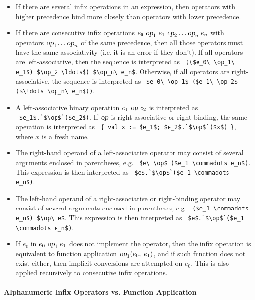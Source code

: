 \begin{itemize}
  \item If there are several infix operations in an expression, then operators with higher precedence bind more closely than operators with lower precedence. 

  \item If there are consecutive infix operations $e_0\ \mbox{\sl op}_1\ e_1\ \mbox{\sl op}_2 \ldots \mbox{\sl op}_n\ e_n$ with operators $\mbox{\sl op}_1 \ldots \mbox{\sl op}_n$ of the same precedence, then all those operators must have the same associativity (i.e. it is an error if they don't). If all operators are left-associative, then the sequence is interpreted as ~\lstinline!(($e_0\ \op_1\ e_1$) $\op_2 \ldots$) $\op_n\ e_n$!. Otherwise, if all operators are right-associative, the sequence is interpreted as ~\lstinline!$e_0\ \op_1$ ($e_1\ \op_2$ ($\ldots \op_n\ e_n$))!.

  \item A left-associative binary operation $e_1\ \mbox{\sl op}\ e_2$ is interpreted as ~\lstinline!$e_1$.`$\op$`($e_2$)!. If $\mbox{\sl op}$ is right-associative or right-binding, the same operation is interpreted as ~\lstinline!{ val x := $e_1$; $e_2$.`$\op$`($x$) }!, where $x$ is a fresh name. 

  \item The right-hand operand of a left-associative operator may consist of several arguments enclosed in parentheses, e.g. ~\lstinline!$e\ \op$ ($e_1 \commadots e_n$)!. This expression is then interpreted as ~\lstinline!$e$.`$\op$`($e_1 \commadots e_n$)!. 

  \item The left-hand operand of a right-associative or right-binding operator may consist of several arguments enclosed in parentheses, e.g. ~\lstinline!($e_1 \commadots e_n$) $\op\ e$!. This expression is then interpreted as ~\lstinline!$e$.`$\op$`($e_1 \commadots e_n$)!. 
  
  \item If $e_0$ in $e_0\ \mbox{\sl op}_1\ e_1$ does not implement the operator, then the infix operation is equivalent to function application $\mbox{\sl op}_1(e_0,\ e_1)$, and if such function does not exist either, then implicit conversions are attempted on $e_0$. This is also applied recursively to consecutive infix operations. 
\end{itemize}





\paragraph{Alphanumeric Infix Operators vs. Function Application}

